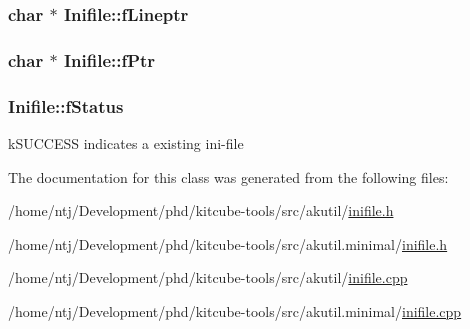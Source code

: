 \hypertarget{classInifile_a7742de9155b0368dd608afdddbf679bf}{
\subsubsection[{f\-Lineptr}]{\setlength{\rightskip}{0pt plus 5cm}char $\ast$ Inifile\-::f\-Lineptr\hspace{0.3cm}{\ttfamily [protected]}}}\label{classInifile_a7742de9155b0368dd608afdddbf679bf}
\hypertarget{classInifile_ab1168d90990e04b72589184377fd07cc}{
\subsubsection[{f\-Ptr}]{\setlength{\rightskip}{0pt plus 5cm}char $\ast$ Inifile\-::f\-Ptr\hspace{0.3cm}{\ttfamily [protected]}}}\label{classInifile_ab1168d90990e04b72589184377fd07cc}
\hypertarget{classInifile_a76e65bc01ffe98d10386326bcb814029}{
\subsubsection[{f\-Status}]{ Inifile\-::f\-Status\hspace{0.3cm}{\ttfamily [protected]}}}\label{classInifile_a76e65bc01ffe98d10386326bcb814029}
k\-S\-U\-C\-C\-E\-S\-S indicates a existing ini-\/file 

The documentation for this class was generated from the following files\-:\begin{DoxyCompactItemize}
\item 
/home/ntj/\-Development/phd/kitcube-\/tools/src/akutil/\hyperlink{inifile_8h}{inifile.\-h}\item 
/home/ntj/\-Development/phd/kitcube-\/tools/src/akutil.\-minimal/\hyperlink{minimal_2inifile_8h}{inifile.\-h}\item 
/home/ntj/\-Development/phd/kitcube-\/tools/src/akutil/\hyperlink{inifile_8cpp}{inifile.\-cpp}\item 
/home/ntj/\-Development/phd/kitcube-\/tools/src/akutil.\-minimal/\hyperlink{minimal_2inifile_8cpp}{inifile.\-cpp}\end{DoxyCompactItemize}
